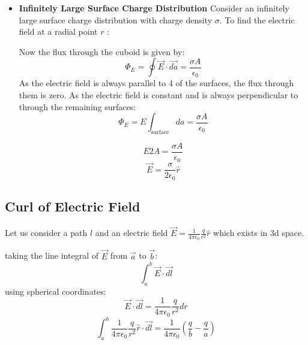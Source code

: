 \documentclass{article}
\begin{document}
\begin{itemize}
\item \textbf{Infinitely Large Surface Charge Distribution}
Consider an infinitely large surface charge distribution with charge density $\sigma$.
To find the electric field at a radial point $r$ :\\


Now the flux through the cuboid is given by:
\[ \Phi_E = \oint \vec{E} \cdot \vec{da} = \frac{\sigma A}{\epsilon_0} \]
As the electric field is always parallel to 4 of the surfaces, the flux through them is zero.
As the electric field is constant and is always perpendicular to through the remaining surfaces:
\[ \Phi_E = E \int_{\text{surface}} da = \frac{\sigma A}{\epsilon_0} \]

\[ E 2 A = \frac{\sigma A}{\epsilon_0} \]
\[ \vec{E} = \frac{\sigma}{2 \epsilon_0} \hat{r} \]
\end{itemize}

\subsection{Curl of Electric Field}
Let us consider a path $l$ and an electric field $\vec{E} = \frac{1}{4 \pi \epsilon_0} \frac{q}{r^2} \hat{r}$ which exists in 3d space.\\


taking the line integral of $\vec{E}$ from $\vec{a}$ to $\vec{b}$:
\[  \int_{a}^{b} \vec{E} \cdot \vec{dl} \]
using spherical coordinates:
\[ \vec{E} \cdot \vec{dl} = \frac{1}{4 \pi\epsilon_0}\frac{q}{r^2} dr \]
\[ \int_{a}^{b} \frac{1}{4 \pi \epsilon_0} \frac{q}{r^2} \hat{r} \cdot \vec{dl} = \frac{1}{4 \pi \epsilon_0}\left(\frac{q}{b} - \frac{q}{a}\right)\]
\end{document}
